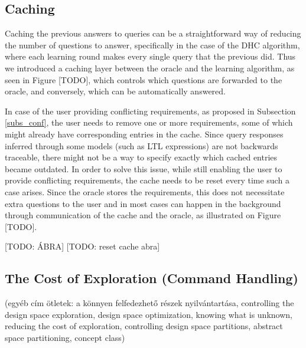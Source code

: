 \subsection{Caching} \label{subs_cachingintheframework}
Caching the previous answers to queries can be a straightforward way of reducing the number of questions to answer, specifically in the case of the DHC algorithm, where each learning round makes every single query that the previous did. Thus we introduced a caching layer between the oracle and the learning algorithm, as seen in Figure [TODO], which controls which questions are forwarded to the oracle, and conversely, which can be automatically answered.

In case of the user providing conflicting requirements, as proposed in Subsection \ref{subs_conf}, the user needs to remove one or more requirements, some of which might already have corresponding entries in the cache. Since query responses inferred through some models (such as LTL expressions) are not backwards traceable, there might not be a way to specify exactly which cached entries became outdated. In order to solve this issue, while still enabling the user to provide conflicting requirements, the cache needs to be reset every time such a case arises. Since the oracle stores the requirements, this does not necessitate extra questions to the user and in most cases can happen in the background through communication of the cache and the oracle, as illustrated on Figure [TODO].

[TODO: ÁBRA] [TODO: reset cache abra]
\subsection{The Cost of Exploration (Command Handling)} \label{subs_commandhandling}
(egyéb cím ötletek: a könnyen felfedezhető részek nyilvántartása, controlling the design space exploration, design space optimization, knowing what is unknown, reducing the cost of exploration, controlling design space partitions, abstract space partitioning, concept class)

